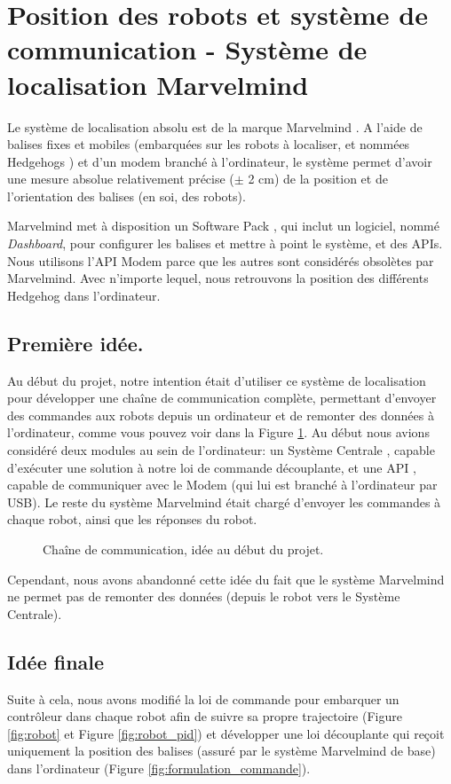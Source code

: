 \section{Position des robots et système de communication - Système de localisation Marvelmind}

Le système de localisation absolu est de la marque Marvelmind \cite{marvelmind-url}. A l’aide de balises fixes et mobiles (embarquées sur les robots à localiser, et nommées \og Hedgehogs \fg{}) et d'un modem branché à l'ordinateur, le système permet d’avoir une mesure absolue relativement précise ($\pm$ 2 cm) de la position et de l’orientation des balises (en soi, des robots). 

Marvelmind met à disposition un \og Software Pack \fg{}, qui inclut un logiciel, nommé \textit{Dashboard}, pour configurer les balises et mettre à point le système, et des APIs. Nous utilisons l'\og API Modem \fg{} parce que les autres sont considérés obsolètes par Marvelmind. Avec n'importe lequel, nous retrouvons la position des différents Hedgehog dans l'ordinateur. 

\subsection{Première idée.}
Au début du projet, notre intention était d'utiliser ce système de localisation pour développer une chaîne de communication complète, permettant d'envoyer des commandes aux robots depuis un ordinateur et de remonter des données à l'ordinateur, comme vous pouvez voir dans la Figure \ref{diagram:communication}. Au début nous avions considéré deux modules au sein de l'ordinateur: un \og Système Centrale \fg{}, capable d'exécuter une solution à notre loi de commande découplante, et une \og API \fg{}, capable de communiquer avec le Modem (qui lui est branché à l'ordinateur par USB). Le reste du système Marvelmind était chargé d'envoyer les commandes à chaque robot, ainsi que les réponses du robot.

\begin{figure}[h!]
    \centering
    
    \caption{Chaîne de communication, idée au début du projet.}
    \label{diagram:communication}
\end{figure}

Cependant, nous avons abandonné cette idée du fait que le système Marvelmind ne permet pas de remonter des données (depuis le robot vers le Système Centrale). 

\subsection{Idée finale}
Suite à cela, nous avons modifié la loi de commande pour embarquer un contrôleur dans chaque robot afin de suivre sa propre trajectoire (Figure \ref{fig:robot} et Figure \ref{fig:robot_pid}) et développer une loi découplante qui reçoit uniquement la position des balises (assuré par le système Marvelmind de base) dans l'ordinateur (Figure \ref{fig:formulation_commande}). 

